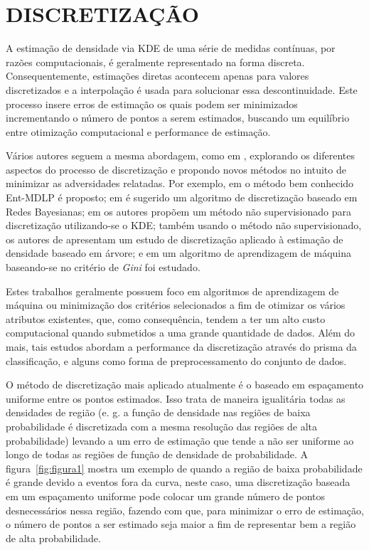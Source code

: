 \chapter{DISCRETIZAÇÃO} \label{cap:disc}
\vspace{-2cm}
A estimação de densidade via \ac{KDE} de uma série de medidas contínuas, por razões computacionais, é geralmente representado na forma discreta. Consequentemente, estimações diretas acontecem apenas para valores discretizados \cite{jones1989discretized} e a interpolação é usada para solucionar essa descontinuidade. Este processo insere erros de estimação os quais podem ser minimizados incrementando o número de pontos a serem estimados, buscando um equilíbrio entre otimização computacional e performance de estimação.

Vários autores seguem a mesma abordagem, como em \cite{jones1989discretized}, explorando os diferentes aspectos do processo de discretização e propondo novos métodos no intuito de minimizar as adversidades relatadas. Por exemplo, em \cite{fayyad1993multi} o método bem conhecido Ent-MDLP é proposto; em \cite{friedman1996discretizing} é sugerido um algoritmo de discretização baseado em Redes Bayesianas; em \cite{biba2007unsupervised} os autores propõem um método não supervisionado para discretização utilizando-se o \ac{KDE}; também usando o método não supervisionado, os autores de \cite{schmidberger2005unsupervised} apresentam um estudo de discretização aplicado à estimação de densidade baseado em árvore; e em \cite{zhang2007discretization} um algoritmo de aprendizagem de máquina baseando-se no critério de \textit{Gini} foi estudado. 

Estes trabalhos geralmente possuem foco em algoritmos de aprendizagem de máquina ou minimização dos critérios selecionados a fim de otimizar os vários atributos existentes, que, como consequência, tendem a ter um alto custo computacional quando submetidos a uma grande quantidade de dados. Além do mais, tais estudos abordam a performance da discretização através do prisma da classificação, e alguns como forma de preprocessamento do conjunto de dados.

O método de discretização mais aplicado atualmente é o baseado em espaçamento uniforme entre os pontos estimados. Isso trata de maneira igualitária todas as densidades de região (e. g. a função de densidade nas regiões de baixa probabilidade é discretizada com a mesma resolução das regiões de alta probabilidade) levando a um erro de estimação que tende a não ser uniforme ao longo de todas as regiões de função de densidade de probabilidade.
A figura~\ref{fig:figura1} mostra um exemplo de quando a região de baixa probabilidade é grande devido a eventos fora da curva, neste caso, uma discretização baseada em um espaçamento uniforme  pode colocar um grande número de pontos desnecessários nessa região, fazendo com que, para minimizar o erro de estimação, o número de pontos a ser estimado seja maior a fim de representar bem a região de alta probabilidade. %

